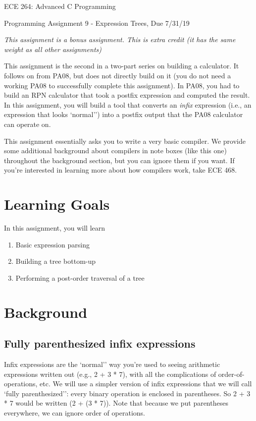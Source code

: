 \documentclass{article}
\begin{document}
\begin{center}{\LARGE ECE 264: Advanced C Programming} \end{center}
\begin{center}{\large Programming Assignment 9 - Expression Trees, Due 7/31/19} \end{center}

\bigskip
{\em This assignment is a bonus assignment. This is extra credit (it has the same weight as all other assignments)}

This assignment is the second in a two-part series on building a calculator. It follows on from PA08, but does not directly build on it (you do not need a working PA08 to successfully complete this assignment). In PA08, you had to build an RPN calculator that took a postfix expression and computed the result. In this assignment, you will build a tool that converts an {\em infix} expression (i.e., an expression that looks `normal'') into a postfix output that the PA08 calculator can operate on.


This assignment essentially asks you to write a very basic compiler. We provide some additional background about compilers in note boxes (like this one) throughout the background section, but you can ignore them if you want. If you're interested in learning more about how compilers work, take ECE 468.


\section{Learning Goals}
In this assignment, you will learn

\begin{enumerate}
\item    Basic expression parsing
\item    Building a tree bottom-up
\item    Performing a post-order traversal of a tree
\end{enumerate}

\section{Background}

\subsection{Fully parenthesized infix expressions}

Infix expressions are the `normal'' way you're used to seeing arithmetic expressions written out (e.g., \textsf{2 + 3 * 7}), with all the complications of order-of-operations, etc. We will use a simpler version of infix expressions that we will call `fully parenthesized'': every binary operation is enclosed in parentheses. So \textsf{2 + 3 * 7} would be written \textsf{(2 + (3 * 7))}. Note that because we put parentheses everywhere, we can ignore order of operations.
\end{document}
